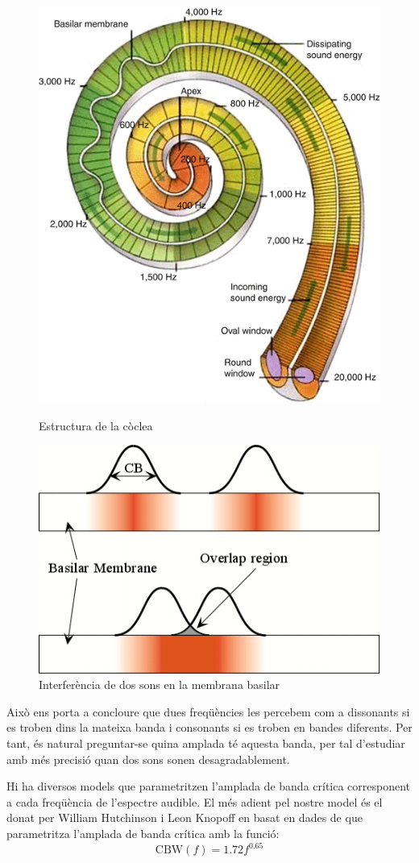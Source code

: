 \documentclass{article}
\theoremstyle{math}
\newcommand{\0}{\ensuremath{\vb{0}}}
\begin{document}
\begin{figure}
    \begin{minipage}[c]{0.49\linewidth}
        \centering
        \includegraphics[height=0.6\linewidth]{Imatges_beamer2/coclea.png}
        \caption{Estructura de la còclea}
        \label{coclea}
    \end{minipage}
    \hfill
    \begin{minipage}[c]{0.49\linewidth}
        \centering
        \includegraphics[height=0.6\linewidth]{Imatges_beamer2/basilar_membrane.jpg}
        \caption{Interferència de dos sons en la mem\-bra\-na basilar}
        \label{membrana}
    \end{minipage}
\end{figure}
Això ens porta a concloure que dues freqüències les percebem com a dissonants si es troben dins la mateixa banda i consonants si es troben en bandes diferents. Per tant, és natural preguntar-se quina amplada té aquesta banda, per tal d'estudiar amb més precisió quan dos sons sonen desagradablement.\par
Hi ha diversos models que parametritzen l'amplada de banda crítica corresponent a cada freqüència de l'espectre audible. El més adient pel nostre model és el donat per William Hutchinson i Leon Knopoff en \cite{hutchinson} basat en dades de \cite{plomp,goodwin,mayer} que parametritza l'amplada de banda crítica amb la funció:
\begin{equation}
    \text{CBW}(f)=1.72 f^{0.65}
    \label{CBW}
\end{equation}
\end{document}
